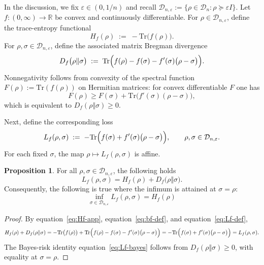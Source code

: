 \documentclass{article}
\theoremstyle{plain}
\theoremstyle{definition}
\def\eqref#1{equation~\ref{#1}}
\newtheorem{proposition}{Proposition}
\begin{document}
\begin{appendices}
In the discussion, we fix $\varepsilon\in(0,1/n)$ and recall
$\mathcal{D}_{n,\varepsilon}:=\{\rho\in\mathcal{D}_n:\rho\succeq \varepsilon I\}$.
Let $f:(0,\infty)\to\mathbb{R}$ be convex and continuously differentiable.
For $\rho\in\mathcal{D}_{n,\varepsilon}$, define the trace-entropy functional
\begin{equation}
H_f(\rho)
\;:=\;
-\mathrm{Tr}\bigl(f(\rho)\bigr).
\label{eq:Hf-app}
\end{equation}
For $\rho,\sigma\in\mathcal{D}_{n,\varepsilon}$, define the associated matrix
Bregman divergence
\begin{equation}
D_f\bigl(\rho\Vert\sigma\bigr)
\;:=\;
\mathrm{Tr}\Bigl(f(\rho)-f(\sigma)-f'(\sigma)\bigl(\rho-\sigma\bigr)\Bigr).
\label{eq:bf-def}
\end{equation}
Nonnegativity follows from convexity of the spectral function
$F(\rho):=\mathrm{Tr}(f(\rho))$ on Hermitian matrices: for convex differentiable
$F$ one has
\[
F(\rho)\ge F(\sigma)+\mathrm{Tr}\bigl(f'(\sigma)(\rho-\sigma)\bigr),
\]
which is equivalent to $D_f(\rho\Vert\sigma)\ge 0$.

Next, define the corresponding loss
\begin{equation}
L_f(\rho,\sigma)
\;:=\;
-\mathrm{Tr}\Bigl(f(\sigma)+f'(\sigma)\bigl(\rho-\sigma\bigr)\Bigr),
\qquad
\rho,\sigma\in\mathcal{D}_{n,\varepsilon}.
\label{eq:Lf-def}
\end{equation}
For each fixed $\sigma$, the map $\rho\mapsto L_f(\rho,\sigma)$ is affine.

\begin{proposition}
\label{prop:entropy-bregman}
For all $\rho,\sigma\in\mathcal{D}_{n,\varepsilon}$, the following holds
\begin{equation}
L_f(\rho,\sigma)
=
H_f(\rho) + D_f\bigl(\rho\Vert\sigma\bigr).
\label{eq:Lf-decomp}
\end{equation}
Consequently, the following is true where the infimum is attained at $\sigma=\rho$:
\begin{equation}
\inf_{\sigma\in\mathcal{D}_{n,\varepsilon}} L_f(\rho,\sigma)
=
H_f(\rho)
\label{eq:Lf-bayes}
\end{equation}
\end{proposition}

\begin{proof}
By \eqref{eq:Hf-app}, \eqref{eq:bf-def}, and \eqref{eq:Lf-def},
\[
H_f(\rho)+D_f(\rho\Vert\sigma)
=
-\mathrm{Tr}\bigl(f(\rho)\bigr)
+
\mathrm{Tr}\Bigl(f(\rho)-f(\sigma)-f'(\sigma)\bigl(\rho-\sigma\bigr)\Bigr)
=
-\mathrm{Tr}\Bigl(f(\sigma)+f'(\sigma)\bigl(\rho-\sigma\bigr)\Bigr)
=
L_f(\rho,\sigma).
\]
The Bayes-risk identity \eqref{eq:Lf-bayes} follows from $D_f(\rho\Vert\sigma)\ge 0$,
with equality at $\sigma=\rho$.
\end{proof}


\end{appendices}
\end{document}
